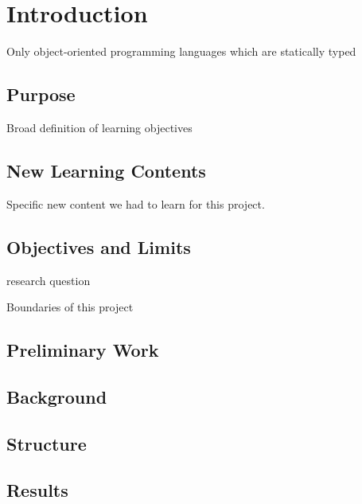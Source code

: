 \section{Introduction}
Only object-oriented programming languages which are statically typed

\subsection{Purpose}
Broad definition of learning objectives

\subsection{New Learning Contents}
Specific new content we had to learn for this project.

\subsection{Objectives and Limits}
research question

Boundaries of this project

\subsection{Preliminary Work}

\subsection{Background}

\subsection{Structure}

\subsection{Results}
